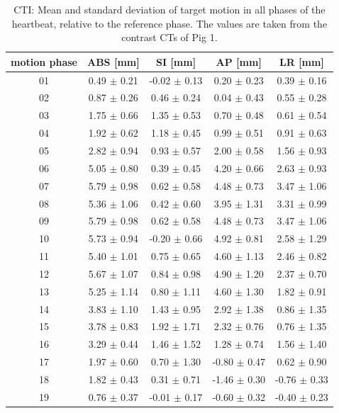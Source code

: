 \documentclass[type=dr, dr=rernat, accentcolor=tud7b,colorbacktitle, bigchapter, openright, twoside, 12pt ]{tudthesis}
\begin{document}
\vspace*{-0.5cm}


\begin{table}[H]
  \centering
  \tiny
  \caption{CTI: Mean and standard deviation of target motion in all phases of the heartbeat, relative to the reference phase. The values are 
  taken from the contrast CTs of Pig 1.}
  \begin{tabular}{|c|c|c|c|c|}
    \hline\hline
    motion phase\rule{0pt}{2.6ex}\rule[-1.2ex]{0pt}{0pt} & ABS [mm] & SI [mm] & AP [mm] & LR [mm]\\
    \hline
01 &0.49 $\pm$ 0.21 &-0.02 $\pm$ 0.13 &0.20 $\pm$ 0.23 &0.39 $\pm$ 0.16 \\
02 &0.87 $\pm$ 0.26 &0.46 $\pm$ 0.24 &0.04 $\pm$ 0.43 &0.55 $\pm$ 0.28 \\
03 &1.75 $\pm$ 0.66 &1.35 $\pm$ 0.53 &0.70 $\pm$ 0.48 &0.61 $\pm$ 0.54 \\
04 &1.92 $\pm$ 0.62 &1.18 $\pm$ 0.45 &0.99 $\pm$ 0.51 &0.91 $\pm$ 0.63 \\
05 &2.82 $\pm$ 0.94 &0.93 $\pm$ 0.57 &2.00 $\pm$ 0.58 &1.56 $\pm$ 0.93 \\
06 &5.05 $\pm$ 0.80 &0.39 $\pm$ 0.45 &4.20 $\pm$ 0.66 &2.63 $\pm$ 0.93 \\
07 &5.79 $\pm$ 0.98 &0.62 $\pm$ 0.58 &4.48 $\pm$ 0.73 &3.47 $\pm$ 1.06 \\
08 &5.36 $\pm$ 1.06 &0.42 $\pm$ 0.60 &3.95 $\pm$ 1.31 &3.31 $\pm$ 0.99 \\
09 &5.79 $\pm$ 0.98 &0.62 $\pm$ 0.58 &4.48 $\pm$ 0.73 &3.47 $\pm$ 1.06 \\
10 &5.73 $\pm$ 0.94 &-0.20 $\pm$ 0.66 &4.92 $\pm$ 0.81 &2.58 $\pm$ 1.29 \\
11 &5.40 $\pm$ 1.01 &0.75 $\pm$ 0.65 &4.60 $\pm$ 1.13 &2.46 $\pm$ 0.82 \\
12 &5.67 $\pm$ 1.07 &0.84 $\pm$ 0.98 &4.90 $\pm$ 1.20 &2.37 $\pm$ 0.70 \\
13 &5.25 $\pm$ 1.14 &0.80 $\pm$ 1.11 &4.60 $\pm$ 1.30 &1.82 $\pm$ 0.91 \\
14 &3.83 $\pm$ 1.10 &1.43 $\pm$ 0.95 &2.92 $\pm$ 1.38 &0.86 $\pm$ 1.35 \\
15 &3.78 $\pm$ 0.83 &1.92 $\pm$ 1.71 &2.32 $\pm$ 0.76 &0.76 $\pm$ 1.35 \\
16 &3.29 $\pm$ 0.44 &1.46 $\pm$ 1.52 &1.28 $\pm$ 0.74 &1.56 $\pm$ 1.40 \\
17 &1.97 $\pm$ 0.60 &0.70 $\pm$ 1.30 &-0.80 $\pm$ 0.47 &0.62 $\pm$ 0.90 \\
18 &1.82 $\pm$ 0.43 &0.31 $\pm$ 0.71 &-1.46 $\pm$ 0.30 &-0.76 $\pm$ 0.33 \\
19 &0.76 $\pm$ 0.37 &-0.01 $\pm$ 0.17 &-0.60 $\pm$ 0.32 &-0.40 $\pm$ 0.23 \\
    \hline\hline
  \end{tabular}
  \label{tab:motion:CTI:Pig1}
\end{table}
\end{document}
